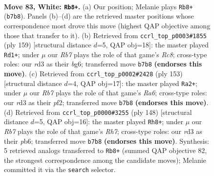 \documentclass[11pt]{article}
\begin{document}
\clearpage

\begin{figure}[p]\centering
\begin{subfigure}{0.46\textwidth}\centering
\resizebox{\linewidth}{!}{%
\newchessgame
\chessboard[
  setfen={6k1/1R6/8/6K1/r6P/3r4/8/8 w - - 7 83},
  showmover=false,
  pgfstyle=straightmove, color=movearrow, markmove={b7-b8}
]}
\caption{}
\end{subfigure}\hfill
\begin{subfigure}{0.46\textwidth}\centering
\resizebox{\linewidth}{!}{%
\newchessgame
\chessboard[
  setfen={6k1/R5p1/6B1/3K4/8/8/8/2r5 b - - 64 80},
  showmover=false,
  pgfstyle=straightmove, color=movearrow, markmove={c1-d1}
]}
\caption{}
\end{subfigure}
\\[4pt]
\begin{subfigure}{0.46\textwidth}\centering
\resizebox{\linewidth}{!}{%
\newchessgame
\chessboard[
  setfen={8/8/2p4R/3k4/8/r7/2K2P2/8 b - - 4 77},
  showmover=false,
  pgfstyle=straightmove, color=movearrow, markmove={a3-a2}
]}
\caption{}
\end{subfigure}\hfill
\begin{subfigure}{0.46\textwidth}\centering
\resizebox{\linewidth}{!}{%
\newchessgame
\chessboard[
  setfen={1k6/7R/1p6/1P4r1/2K5/8/8/8 w - - 9 75},
  showmover=false,
  pgfstyle=straightmove, color=movearrow, markmove={h7-h8}
]}
\caption{}
\end{subfigure}
\caption{\textbf{Move 83, White: \texttt{Rb8+}.} (a) Our position; Melanie plays \texttt{Rb8+} (\texttt{b7b8}). Panels (b)--(d) are the retrieved master positions whose correspondence most drove this move (highest QAP objective among those that transfer to it). (b) Retrieved from \texttt{ccrl\_top\_p0003\#1855} (ply 159) [structural distance $d$=5, QAP obj=18]: the master played \texttt{Rd1+}; under $\mu$ our \emph{Rb7} plays the role of that game's \emph{Rc8}; cross-type roles: our \emph{r}d3 as their \emph{b}g6; transferred move \texttt{b7b8} \textbf{(endorses this move)}. (c) Retrieved from \texttt{ccrl\_top\_p0002\#2428} (ply 153) [structural distance $d$=4, QAP obj=17]: the master played \texttt{Ra2+}; under $\mu$ our \emph{Rb7} plays the role of that game's \emph{Ra6}; cross-type roles: our \emph{r}d3 as their \emph{p}f2; transferred move \texttt{b7b8} \textbf{(endorses this move)}. (d) Retrieved from \texttt{ccrl\_top\_p0000\#3255} (ply 148) [structural distance $d$=5, QAP obj=16]: the master played \texttt{Rh8+}; under $\mu$ our \emph{Rb7} plays the role of that game's \emph{Rh7}; cross-type roles: our \emph{r}d3 as their \emph{p}b6; transferred move \texttt{b7b8} \textbf{(endorses this move)}. Synthesis: 5 retrieved analogs transferred to \texttt{Rb8+} (summed QAP objective 82, the strongest correspondence among the candidate moves); Melanie committed it via the \texttt{search} selector.}
\label{fig:thought-m164}
\end{figure}
\end{document}
